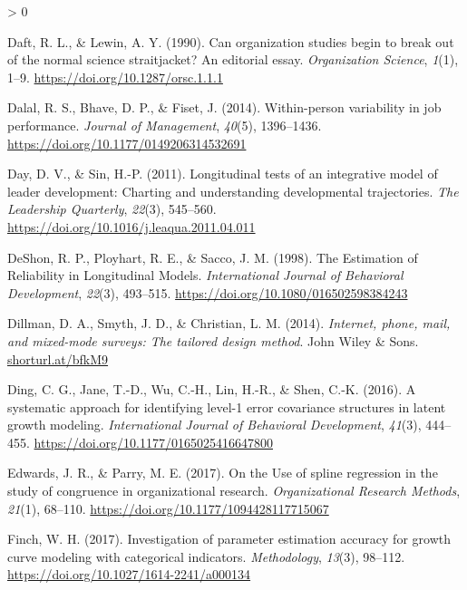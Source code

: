\documentclass[
12pt, %
twoside,
english]{guelphthesis}
\newlength{\cslhangindent}
\newenvironment{CSLReferences}[2] %
 {%
  \setlength{\parindent}{0pt}
  \ifodd #1 \everypar{\setlength{\hangindent}{\cslhangindent}}\ignorespaces\fi
  \ifnum #2 > 0
  \setlength{\parskip}{\linespacing{2}}
  \fi
 }%
 {}
\begin{document}
\begin{CSLReferences}{1}{0}
\leavevmode{}%
Daft, R. L., \& Lewin, A. Y. (1990). Can organization studies begin to break out of the normal science straitjacket? An editorial essay. \emph{Organization Science}, \emph{1}(1), 1--9. \url{https://doi.org/10.1287/orsc.1.1.1}

\leavevmode{}%
Dalal, R. S., Bhave, D. P., \& Fiset, J. (2014). Within-person variability in job performance. \emph{Journal of Management}, \emph{40}(5), 1396--1436. \url{https://doi.org/10.1177/0149206314532691}

\leavevmode{}%
Day, D. V., \& Sin, H.-P. (2011). Longitudinal tests of an integrative model of leader development: Charting and understanding developmental trajectories. \emph{The Leadership Quarterly}, \emph{22}(3), 545--560. \url{https://doi.org/10.1016/j.leaqua.2011.04.011}

\leavevmode{}%
DeShon, R. P., Ployhart, R. E., \& Sacco, J. M. (1998). The Estimation of Reliability in Longitudinal Models. \emph{International Journal of Behavioral Development}, \emph{22}(3), 493--515. \url{https://doi.org/10.1080/016502598384243}

\leavevmode{}%
Dillman, D. A., Smyth, J. D., \& Christian, L. M. (2014). \emph{Internet, phone, mail, and mixed-mode surveys: The tailored design method}. John Wiley \& Sons. \href{https://shorturl.at/bfkM9}{shorturl.at/bfkM9}

\leavevmode{}%
Ding, C. G., Jane, T.-D., Wu, C.-H., Lin, H.-R., \& Shen, C.-K. (2016). A systematic approach for identifying level-1 error covariance structures in latent growth modeling. \emph{International Journal of Behavioral Development}, \emph{41}(3), 444--455. \url{https://doi.org/10.1177/0165025416647800}

\leavevmode{}%
Edwards, J. R., \& Parry, M. E. (2017). On the Use of spline regression in the study of congruence in organizational research. \emph{Organizational Research Methods}, \emph{21}(1), 68--110. \url{https://doi.org/10.1177/1094428117715067}

\leavevmode{}%
Finch, W. H. (2017). Investigation of parameter estimation accuracy for growth curve modeling with categorical indicators. \emph{Methodology}, \emph{13}(3), 98--112. \url{https://doi.org/10.1027/1614-2241/a000134}


\end{CSLReferences}
\end{document}
